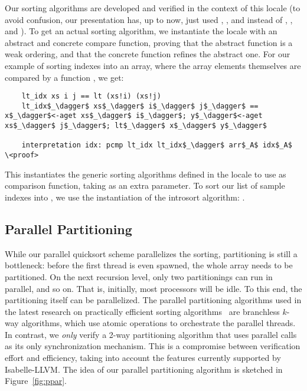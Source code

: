 \documentclass[sn-mathphys,Numbered]{sn-jnl}
\theoremstyle{thmstyleone}%
\theoremstyle{definition}%
\theoremstyle{thmstylethree}%
\begin{document}
  Our sorting algorithms are developed and verified in the context of this locale (to avoid confusion, our presentation has, up to now, just used \is{<}, \is{<=}, and  instead of , , and ).
  To get an actual sorting algorithm, we instantiate the locale with an abstract and concrete compare function, proving
  that the abstract function is a weak ordering, and that the concrete function refines the abstract one.
  For our example of sorting indexes into an array, where the array elements themselves are compared by a function , we get:
  \begin{lstlisting}
    lt_idx xs i j == lt (xs!i) (xs!j)
    lt_idx$_\dagger$ xs$_\dagger$ i$_\dagger$ j$_\dagger$ == x$_\dagger$<-aget xs$_\dagger$ i$_\dagger$; y$_\dagger$<-aget xs$_\dagger$ j$_\dagger$; lt$_\dagger$ x$_\dagger$ y$_\dagger$

    interpretation idx: pcmp lt_idx lt_idx$_\dagger$ arr$_A$ idx$_A$   \<proof>
  \end{lstlisting}
  This instantiates the generic sorting algorithms defined in the  locale to use  as comparison function, taking  as an extra parameter. To sort our list  of sample indexes into , we use the instantiation of the introsort algorithm: .

  \subsection{Parallel Partitioning}\label{sec:ppar}
  While our parallel quicksort scheme parallelizes the sorting, partitioning is still a bottleneck:
  before the first thread is even spawned, the whole array needs to be partitioned. On the next recursion level,
  only two partitionings can run in parallel, and so on. That is, initially,
  most processors will be idle. To this end, the partitioning itself can be parallelized.
  The parallel partitioning algorithms used in the latest research on practically efficient sorting
  algorithms~\cite{AWFS22} are branchless $k$-way algorithms, which use atomic operations to orchestrate the parallel threads.
  In contrast, we \emph{only} verify a 2-way partitioning algorithm that uses parallel calls as its only synchronization mechanism.
  This is a compromise between verification effort and efficiency, taking into account the features currently supported by Isabelle-LLVM.
  The idea of our parallel partitioning algorithm is sketched in Figure~\ref{fig:ppar}.
\end{document}
